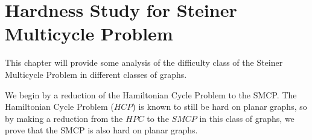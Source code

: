 \chapter{Hardness Study for Steiner Multicycle Problem}
\label{chapter:hardness}

This chapter will provide some analysis of the difficulty class of the Steiner Multicycle Problem in different classes of graphs.

We begin by a reduction of the Hamiltonian Cycle Problem to the SMCP. The Hamiltonian Cycle Problem (\(HCP\)) is known to still be hard on planar graphs, so by making a reduction from the \(HPC\) to the \(SMCP\) in this class of graphs, we prove that the SMCP is also hard on planar graphs.


